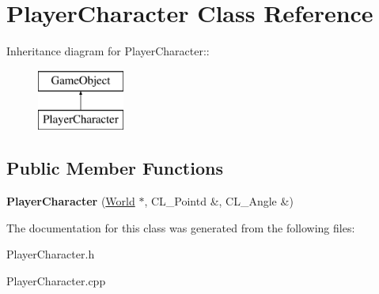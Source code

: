 \hypertarget{classPlayerCharacter}{
\section{PlayerCharacter Class Reference}
\label{classPlayerCharacter}
}
Inheritance diagram for PlayerCharacter::\begin{figure}[H]
\begin{center}
\leavevmode
\includegraphics[height=2cm]{classPlayerCharacter}
\end{center}
\end{figure}
\subsection*{Public Member Functions}
\begin{DoxyCompactItemize}
\item 
\hypertarget{classPlayerCharacter_a0207723ef3dc387dcf80b01839715d31}{
{\bfseries PlayerCharacter} (\hyperlink{classWorld}{World} $\ast$, CL\_\-Pointd \&, CL\_\-Angle \&)}
\label{classPlayerCharacter_a0207723ef3dc387dcf80b01839715d31}

\end{DoxyCompactItemize}


The documentation for this class was generated from the following files:\begin{DoxyCompactItemize}
\item 
PlayerCharacter.h\item 
PlayerCharacter.cpp\end{DoxyCompactItemize}
